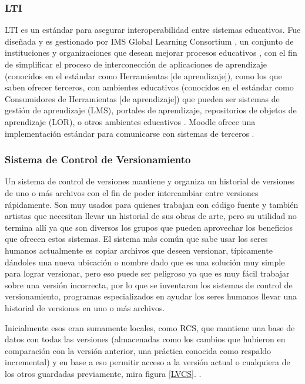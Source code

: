 \subsubsection{LTI}
LTI es un estándar para asegurar interoperabilidad entre sistemas educativos. Fue diseñada y es gestionado por IMS Global Learning Consortium \citep{IMS-Global-LTI}, un conjunto de instituciones y organizaciones que desean mejorar procesos educativos \citep{IMS-Global-Members}, con el fin de simplificar el proceso de interconección de aplicaciones de aprendizaje (conocidos en el estándar como Herramientas [de aprendizaje]), como los que saben ofrecer terceros, con ambientes educativos (conocidos en el estándar como Consumidores de Herramientas [de aprendizaje]) que pueden ser sistemas de gestión de aprendizaje (LMS), portales de aprendizaje, repositorios de objetos de aprendizaje (LOR), o otros ambientes educativos \citep{IMS-Global-LTI}. Moodle ofrece una implementación estándar para comunicarse con sistemas de terceros \citep{MOODLE-DOCS-Features}.

\subsubsection{Sistema de Control de Versionamiento}
Un sistema de control de versiones mantiene y organiza un historial de versiones de uno o más archivos con el fin de poder intercambiar entre versiones rápidamente. Son muy usados para quienes trabajan con código fuente y también artistas \citep{PROGIT-Git-VCS} que necesitan llevar un historial de sus obras de arte, pero su utilidad no termina allí ya que son diversos los grupos que pueden aprovechar los beneficios que ofrecen estos sistemas. El sistema màs común que sabe usar los seres humanos actualmente es copiar archivos que deseen versionar, típicamente dándoles una nueva ubicación o nombre dado que es una solución muy simple para lograr versionar, pero eso puede ser peligroso ya que es muy fácil trabajar sobre una versión incorrecta, por lo que se inventaron los sistemas de control de versionamiento, programas especializados en ayudar los seres humanos llevar una historial de versiones en uno o más archivos.

Inicialmente esos eran sumamente locales, como RCS, que mantiene una base de datos con todas las versiones (almacenadas como los cambios que hubieron en comparación con la versión anterior, una práctica conocida como respaldo incremental) y en base a eso permitir acceso a la versión actual o cualquiera de los otros guardadas previamente, mira figura \ref{LVCS}. \citep{PROGIT-Git-VCS}.


